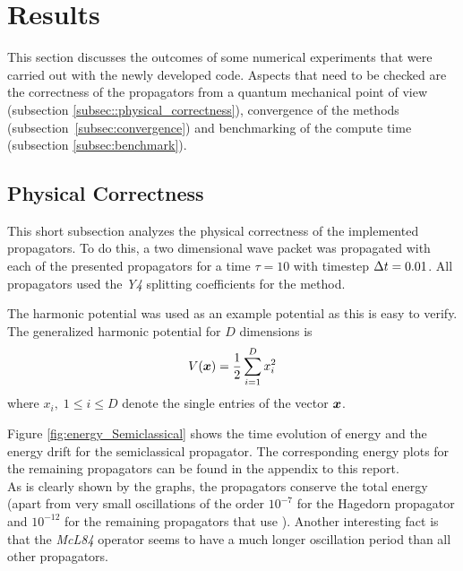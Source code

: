 \section{Results}
\label{sec:results}
%
This section discusses the outcomes of some numerical experiments that were carried out with the newly developed code.
Aspects that need to be checked are the correctness of the propagators from a quantum mechanical point of view (subsection \ref{subsec::physical_correctness}), convergence of the methods (subsection~\ref{subsec:convergence}) and benchmarking of the compute time (subsection \ref{subsec:benchmark}).

\subsection{Physical Correctness}
\label{subsec:physical_correctness}
%
This short subsection analyzes the physical correctness of the implemented propagators.
To do this, a two dimensional wave packet was propagated with each of the presented propagators for a time $\tau = 10$ with timestep $\Delta t = 0.01$.
All propagators used the \emph{Y4} splitting coefficients for the  method.
\par\medskip
%
The harmonic potential was used as an example potential as this is easy to verify.
The generalized harmonic potential for $D$ dimensions is
\begin{align}
	V(\bm{x}) = 
	\frac{1}{2} \sum_{i=1}^D x_i^2
\end{align}
%
where $x_i, \; 1 \le i \le D$ denote the single entries of the vector $\bm{x}$.
\par\medskip
%
Figure \ref{fig:energy_Semiclassical} shows the time evolution of energy and the energy drift for the semiclassical propagator. The corresponding energy plots for the remaining propagators can be found in the appendix to this report. \\
As is clearly shown by the graphs, the propagators conserve the total energy (apart from very small oscillations of the order $10^{-7}$ for the Hagedorn propagator and $10^{-12}$ for the remaining propagators that use ).
Another interesting fact is that the \emph{McL84} operator seems to have a much longer oscillation period than all other propagators.
%
